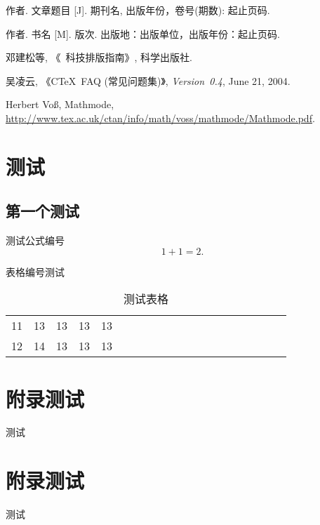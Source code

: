 \documentclass[forprint]{WHUBachelor}
\begin{document}
  
  
  \cleardoublepage{}
  \begin{thebibliography}{00}
  
     作者. 文章题目 [J].  期刊名, 出版年份，卷号(期数): 起止页码.
  
     作者. 书名 [M]. 版次. 出版地：出版单位，出版年份：起止页码.
  
     邓建松等, 《\LaTeXe~科技排版指南》, 科学出版社.
  
     吴凌云, 《CTeX~FAQ (常见问题集)》, \textit{Version~0.4}, June 21, 2004.
  
     Herbert Vo\ss, Mathmode, \url{http://www.tex.ac.uk/ctan/info/math/voss/mathmode/Mathmode.pdf}.
  
  
  \end{thebibliography}
  
  
  \appendix
  
  \chapter{测试}
  
  \section{第一个测试}
  测试公式编号
  \begin{equation}
  1+1=2.
  \end{equation}
  
  表格编号测试
  
  \begin{table}[h]
    \centering
    \caption{测试表格}
    \begin{tabular}{*{20}c}
       \hline
       11 & 13  & 13  & 13  & 13 \\
       12 & 14  & 13  & 13  & 13 \\
       \hline
     \end{tabular}
  \end{table}
  
  
  \chapter{附录测试}
  
  测试
  
  \chapter{附录测试}
  
  测试
  
  \cleardoublepage
  
\end{document}
